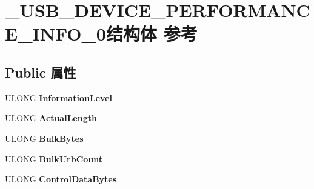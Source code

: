 \hypertarget{struct___u_s_b___d_e_v_i_c_e___p_e_r_f_o_r_m_a_n_c_e___i_n_f_o__0}{}\section{\+\_\+\+U\+S\+B\+\_\+\+D\+E\+V\+I\+C\+E\+\_\+\+P\+E\+R\+F\+O\+R\+M\+A\+N\+C\+E\+\_\+\+I\+N\+F\+O\+\_\+0结构体 参考}
\label{struct___u_s_b___d_e_v_i_c_e___p_e_r_f_o_r_m_a_n_c_e___i_n_f_o__0}
\subsection*{Public 属性}
\begin{DoxyCompactItemize}
\item 
\mbox{\label{struct___u_s_b___d_e_v_i_c_e___p_e_r_f_o_r_m_a_n_c_e___i_n_f_o__0_afe67c4898ba71c205476d113f11095aa}} 
U\+L\+O\+NG {\bfseries Information\+Level}
\item 
\mbox{\label{struct___u_s_b___d_e_v_i_c_e___p_e_r_f_o_r_m_a_n_c_e___i_n_f_o__0_a7ad7292768bcf2b18a75fc8080842c6f}} 
U\+L\+O\+NG {\bfseries Actual\+Length}
\item 
\mbox{\label{struct___u_s_b___d_e_v_i_c_e___p_e_r_f_o_r_m_a_n_c_e___i_n_f_o__0_ac6b9fdc285242105978ae3c81dc1ae7a}} 
U\+L\+O\+NG {\bfseries Bulk\+Bytes}
\item 
\mbox{\label{struct___u_s_b___d_e_v_i_c_e___p_e_r_f_o_r_m_a_n_c_e___i_n_f_o__0_a83b5ee0d7f9dbdbb6a959c017842eaa2}} 
U\+L\+O\+NG {\bfseries Bulk\+Urb\+Count}
\item 
\mbox{\label{struct___u_s_b___d_e_v_i_c_e___p_e_r_f_o_r_m_a_n_c_e___i_n_f_o__0_a8815d3d4e38c73f5af1188b48ead2ef3}} 
U\+L\+O\+NG {\bfseries Control\+Data\+Bytes}
\item 
\mbox{\label{struct___u_s_b___d_e_v_i_c_e___p_e_r_f_o_r_m_a_n_c_e___i_n_f_o__0_a8b7278feb2e08623cd42ac7789a2fc44}} 

\end{DoxyCompactItemize}
